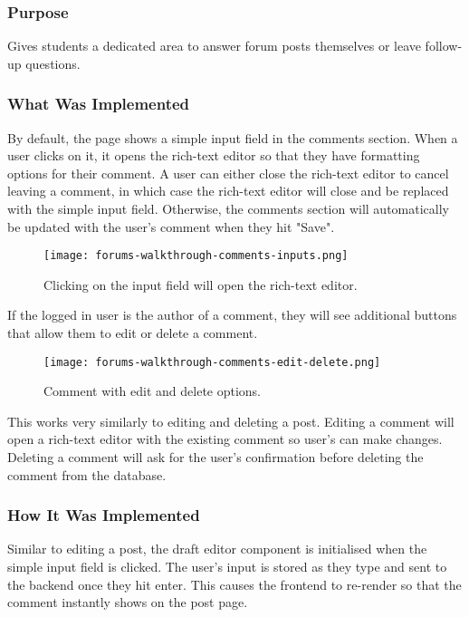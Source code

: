 \subsubsection{Purpose}
Gives students a dedicated area to answer forum posts themselves or leave follow-up questions.

\subsubsection{What Was Implemented}
By default, the page shows a simple input field in the comments section.
When a user clicks on it, it opens the rich-text editor so that they have formatting options for their comment.
A user can either close the rich-text editor to cancel leaving a comment, in which case the rich-text editor will close and be replaced with the simple input field.
Otherwise, the comments section will automatically be updated with the user's comment when they hit "Save".

\begin{figure}[h!]
    \texttt{[image: forums-walkthrough-comments-inputs.png]}
    \centering
    \caption{Clicking on the input field will open the rich-text editor.}
\end{figure}

If the logged in user is the author of a comment, they will see additional buttons that allow them to edit or delete a comment.

\begin{figure}[h!]
    \texttt{[image: forums-walkthrough-comments-edit-delete.png]}
    \centering
    \caption{Comment with edit and delete options.}
\end{figure}

This works very similarly to editing and deleting a post.
Editing a comment will open a rich-text editor with the existing comment so user's can make changes.
Deleting a comment will ask for the user's confirmation before deleting the comment from the database.

\subsubsection{How It Was Implemented}
Similar to editing a post, the draft editor component is initialised when the simple input field is clicked.
The user's input is stored as they type and sent to the backend once they hit enter.
This causes the frontend to re-render so that the comment instantly shows on the post page.

